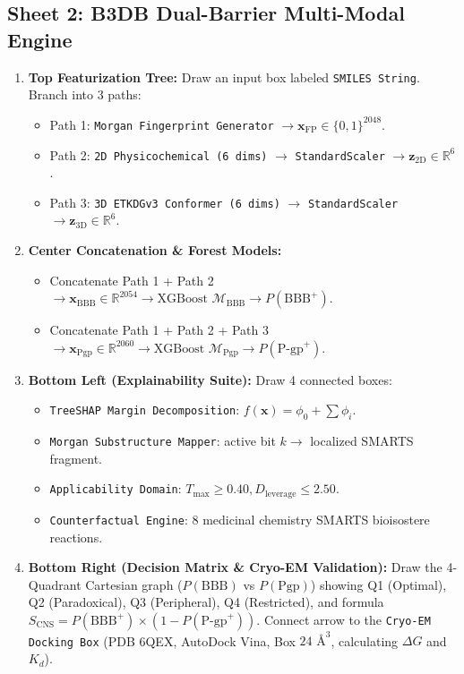 \documentclass[11pt,a4paper]{article}
\begin{document}
\subsection{Sheet 2: B3DB Dual-Barrier Multi-Modal Engine}
\begin{enumerate}[leftmargin=*]
    \item \textbf{Top Featurization Tree:}
    Draw an input box labeled \texttt{SMILES String}. Branch into 3 paths:
    \begin{itemize}
        \item Path 1: \texttt{Morgan Fingerprint Generator} $\to \mathbf{x}_{\text{FP}} \in \{0, 1\}^{2048}$.
        \item Path 2: \texttt{2D Physicochemical (6 dims)} $\to$ \texttt{StandardScaler} $\to \mathbf{z}_{\text{2D}} \in \mathbb{R}^6$.
        \item Path 3: \texttt{3D ETKDGv3 Conformer (6 dims)} $\to$ \texttt{StandardScaler} $\to \mathbf{z}_{\text{3D}} \in \mathbb{R}^6$.
    \end{itemize}
    \item \textbf{Center Concatenation \& Forest Models:}
    \begin{itemize}
        \item Concatenate Path 1 + Path 2 $\to \mathbf{x}_{\text{BBB}} \in \mathbb{R}^{2054} \to \text{XGBoost } \mathcal{M}_{\text{BBB}} \to P(\text{BBB}^+)$.
        \item Concatenate Path 1 + Path 2 + Path 3 $\to \mathbf{x}_{\text{Pgp}} \in \mathbb{R}^{2060} \to \text{XGBoost } \mathcal{M}_{\text{Pgp}} \to P(\text{P-gp}^+)$.
    \end{itemize}
    \item \textbf{Bottom Left (Explainability Suite):}
    Draw 4 connected boxes:
    \begin{itemize}
        \item \texttt{TreeSHAP Margin Decomposition}: $f(\mathbf{x}) = \phi_0 + \sum \phi_i$.
        \item \texttt{Morgan Substructure Mapper}: active bit $k \to$ localized SMARTS fragment.
        \item \texttt{Applicability Domain}: $T_{\max} \ge 0.40, D_{\text{leverage}} \le 2.50$.
        \item \texttt{Counterfactual Engine}: 8 medicinal chemistry SMARTS bioisostere reactions.
    \end{itemize}
    \item \textbf{Bottom Right (Decision Matrix \& Cryo-EM Validation):}
    Draw the 4-Quadrant Cartesian graph ($P(\text{BBB})$ vs $P(\text{Pgp})$) showing Q1 (Optimal), Q2 (Paradoxical), Q3 (Peripheral), Q4 (Restricted), and formula $S_{\text{CNS}} = P(\text{BBB}^+) \times (1 - P(\text{P-gp}^+))$. Connect arrow to the \texttt{Cryo-EM Docking Box} (PDB 6QEX, AutoDock Vina, Box $24\text{ \AA}^3$, calculating $\Delta G$ and $K_d$).
\end{enumerate}
\end{document}
